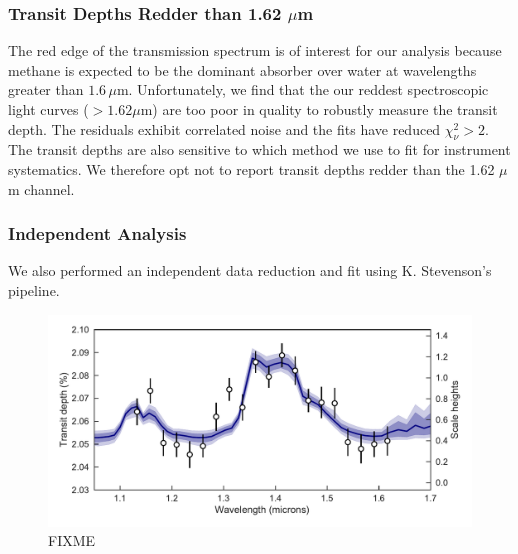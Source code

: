 \documentclass[twocolumn]{aastex61}
\begin{document}
\subsubsection{Transit Depths Redder than 1.62 $\mu$m}
The red edge of the transmission spectrum is of interest for our analysis because methane is expected to be the dominant absorber over water at wavelengths greater than $1.6\,\mu$m. Unfortunately, we find that the our reddest spectroscopic light curves ($>1.62\mu$m) are too poor in quality to robustly measure the transit depth. The residuals exhibit correlated noise and the fits have reduced $\chi^2_\nu>2$. The transit depths are also sensitive to which method we use to fit for instrument systematics.  We therefore opt not to report transit depths redder than the 1.62 $\mu$m channel.

\subsubsection{Independent Analysis}
We also performed an independent data reduction and fit using K. Stevenson's pipeline.

\begin{figure}
\includegraphics[width = \textwidth]{Figures/spectrum.pdf}
\caption{FIXME}
\label{fig:spectrum}
\end{figure}
\end{document}
